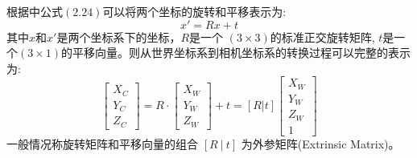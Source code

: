 \documentclass[12pt]{book}
\begin{document}
根据\cite{computevision}中公式$(2.24)$可以将两个坐标的旋转和平移表示为:
\begin{equation}\label{cv:rotatin_and_translation}
	x' = Rx + t
\end{equation}
其中$x$和$x'$是两个坐标系下的坐标，$R$是一个 $(3 \times 3)$的标准正交旋转矩阵, $t$是一个$(3 \times 1)$的平移向量。则从世界坐标系到相机坐标系的转换过程可以完整的表示为:
\begin{equation}\label{eq:rotatin_and_translation}
\left[ {\begin{array}{*{20}{c}}
		{{X_C}}\\
		{{Y_C}}\\
		{{Z_C}}
\end{array}} \right] = R \cdot \left[ {\begin{array}{*{20}{c}}
		{{X_W}}\\
		{{Y_W}}\\
		{{Z_W}}
\end{array}} \right] + t = [R|t]\left[ {\begin{array}{*{20}{c}}
		{{X_W}}\\
		{{Y_W}}\\
		{{Z_W}}\\
		1
\end{array}} \right]
\end{equation}
一般情况称旋转矩阵和平移向量的组合 $[R\ |\ t]$ 为外参矩阵(Extrinsic Matrix)。
\end{document}
